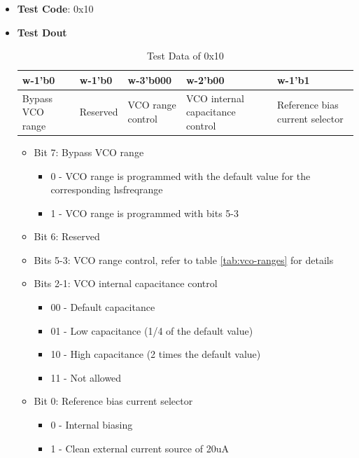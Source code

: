 \documentclass[main\_\_EN.tex]{subfiles}
\begin{document}
\begin{itemize}
    \item \textbf{Test Code}: 0x10
    \item \textbf{Test Dout} 
        \begin{longtable}{ |p{3cm}|p{3cm}|p{3cm}|p{3cm}|p{3cm}|}
            \caption{Test Data of 0x10}
            \label{tab:test-data-0x10} \\
            \hline
            \rowcolor{lightgray}
            \textbf{w-1'b0} & \textbf{w-1'b0} & \textbf{w-3'b000} & \textbf{w-2'b00} & \textbf{w-1'b1} \\ \hline
            Bypass VCO range & Reserved & VCO range control & VCO internal capacitance control & Reference bias current selector  \\ \hline
        \end{longtable}
        \begin{itemize}
            \item Bit 7: Bypass VCO range
                \begin{itemize}
                    \item 0 - VCO range is programmed with the default value for the corresponding hsfreqrange
                    \item 1 - VCO range is programmed with bits 5-3
                \end{itemize}
            \item Bit 6: Reserved
            \item Bits 5-3: VCO range control, refer to table \ref{tab:vco-ranges} for details
            \item Bits 2-1: VCO internal capacitance control
                \begin{itemize}
                    \item 00 - Default capacitance
                    \item 01 - Low capacitance (1/4 of the default value)
                    \item 10 - High capacitance (2 times the default value)
                    \item 11 - Not allowed
                \end{itemize}
            \item Bit 0: Reference bias current selector
                \begin{itemize}
                    \item 0 - Internal biasing
                    \item 1 - Clean external current source of 20uA

\end{itemize}
\end{itemize}
\end{itemize}
\end{document}
